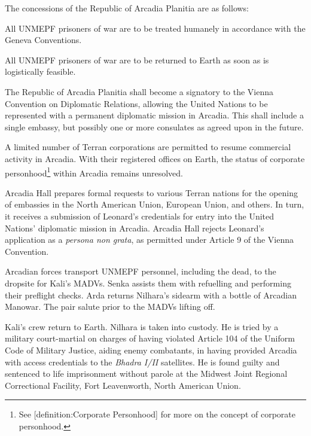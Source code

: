 The concessions of the Republic of Arcadia Planitia are as follows:

\startitemize[n]
\item All UNMEPF prisoners of war are to be treated humanely in accordance with the Geneva Conventions.

\item All UNMEPF prisoners of war are to be returned to Earth as soon as is logistically feasible.

\item The Republic of Arcadia Planitia shall become a signatory to the Vienna Convention on Diplomatic Relations, allowing the United Nations to be represented with a permanent diplomatic mission in Arcadia. This shall include a single embassy, but possibly one or more consulates as agreed upon in the future.

\item A limited number of Terran corporations are permitted to resume commercial activity in Arcadia. With their registered offices on Earth, the status of corporate personhood\footnote{See [definition:Corporate Personhood] for more on the concept of corporate personhood.} within Arcadia remains unresolved.
\stopitemize

Arcadia Hall prepares formal requests to various Terran nations for the opening of embassies in the North American Union, European Union, and others. In turn, it receives a submission of Leonard's credentials for entry into the United Nations' diplomatic mission in Arcadia. Arcadia Hall rejects Leonard's application as a {\it persona non grata}, as permitted under Article 9 of the Vienna Convention.
\StopTimelineDate

Arcadian forces transport UNMEPF personnel, including the dead, to the dropsite for Kali's MADVs. Senka assists them with refuelling and performing their preflight checks. Arda returns Nilhara's sidearm with a bottle of Arcadian Manowar. The pair salute prior to the MADVs lifting off.
\StopTimelineDate

Kali's crew return to Earth. Nilhara is taken into custody. He is tried by a military court-martial on charges of having violated Article 104 of the Uniform Code of Military Justice, aiding enemy combatants, in having provided Arcadia with access credentials to the {\it Bhadra I/II} satellites. He is found guilty and sentenced to life imprisonment without parole at the Midwest Joint Regional Correctional Facility, Fort Leavenworth, North American Union.
\StopTimelineDate

